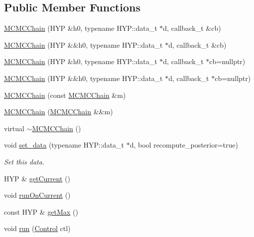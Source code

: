 \subsection*{Public Member Functions}
\begin{DoxyCompactItemize}
\item 
\hyperlink{class_m_c_m_c_chain_aed5ffea5a46a380b8b0d78cd46c96a97}{M\+C\+M\+C\+Chain} (H\+YP \&h0, typename H\+Y\+P\+::data\+\_\+t $\ast$d, callback\+\_\+t \&cb)
\item 
\hyperlink{class_m_c_m_c_chain_a731f2ca6416f1daa84cd54cd3f9281b2}{M\+C\+M\+C\+Chain} (H\+YP \&\&h0, typename H\+Y\+P\+::data\+\_\+t $\ast$d, callback\+\_\+t \&cb)
\item 
\hyperlink{class_m_c_m_c_chain_afaa9a75b515252a8c6237aad0211a2f2}{M\+C\+M\+C\+Chain} (H\+YP \&h0, typename H\+Y\+P\+::data\+\_\+t $\ast$d, callback\+\_\+t $\ast$cb=nullptr)
\item 
\hyperlink{class_m_c_m_c_chain_a8df81470759ddd5654c5a82ad3b185cf}{M\+C\+M\+C\+Chain} (H\+YP \&\&h0, typename H\+Y\+P\+::data\+\_\+t $\ast$d, callback\+\_\+t $\ast$cb=nullptr)
\item 
\hyperlink{class_m_c_m_c_chain_a3942ff362dcc0bdfdad296f95048f14e}{M\+C\+M\+C\+Chain} (const \hyperlink{class_m_c_m_c_chain}{M\+C\+M\+C\+Chain} \&m)
\item 
\hyperlink{class_m_c_m_c_chain_a2db84c6b92af066b34eedd257d800417}{M\+C\+M\+C\+Chain} (\hyperlink{class_m_c_m_c_chain}{M\+C\+M\+C\+Chain} \&\&m)
\item 
virtual \hyperlink{class_m_c_m_c_chain_ad19438dd99bdba43b5175705e2bef156}{$\sim$\+M\+C\+M\+C\+Chain} ()
\item 
void \hyperlink{class_m_c_m_c_chain_abffc3094cfcb23d692a5e1ab467d3e45}{set\+\_\+data} (typename H\+Y\+P\+::data\+\_\+t $\ast$d, bool recompute\+\_\+posterior=true)
\begin{DoxyCompactList}\small\item\em Set this data. \end{DoxyCompactList}\item 
H\+YP \& \hyperlink{class_m_c_m_c_chain_ae76c66b5bcbc02df926e5f9a91acff17}{get\+Current} ()
\item 
void \hyperlink{class_m_c_m_c_chain_a4214114e0ef4adcd4badfe1440693190}{run\+On\+Current} ()
\item 
const H\+YP \& \hyperlink{class_m_c_m_c_chain_aa5c2bf3cae9a5959cab43e04b1201ed2}{get\+Max} ()
\item 
void \hyperlink{class_m_c_m_c_chain_aef30134b1915b8b494040771480d6b80}{run} (\hyperlink{struct_control}{Control} ctl)

\end{DoxyCompactItemize}
